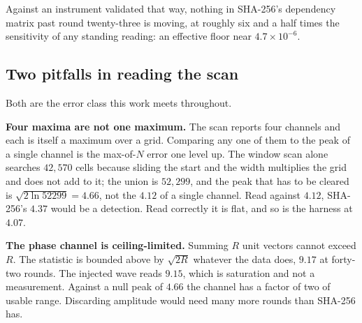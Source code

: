 Against an instrument validated that way, nothing in SHA-256's dependency matrix past round
twenty-three is moving, at roughly six and a half times the sensitivity of any standing reading:
an effective floor near \(4.7 \times 10^{-6}\).

\subsection{Two pitfalls in reading the scan}

Both are the error class this work meets throughout.

\textbf{Four maxima are not one maximum.} The scan reports four channels and each is itself a
maximum over a grid. Comparing any one of them to the peak of a single channel is the max-of-\(N\)
error one level up. The window scan alone searches \(42{,}570\) cells because sliding the start and
the width multiplies the grid and does not add to it; the union is \(52{,}299\), and the peak
that has to be cleared is \(\sqrt{2 \ln 52299} = 4.66\), not the \(4.12\) of a single channel.
Read against \(4.12\), SHA-256's \(4.37\) would be a detection. Read correctly it is flat, and so is
the harness at \(4.07\).

\textbf{The phase channel is ceiling-limited.} Summing \(R\) unit vectors cannot exceed \(R\). The
statistic is bounded above by \(\sqrt{2R}\) whatever the data does, \(9.17\) at forty-two
rounds. The injected wave reads \(9.15\), which is saturation and not a measurement. Against a
null peak of \(4.66\) the channel has a factor of two of usable range. Discarding amplitude would
need many more rounds than SHA-256 has.

